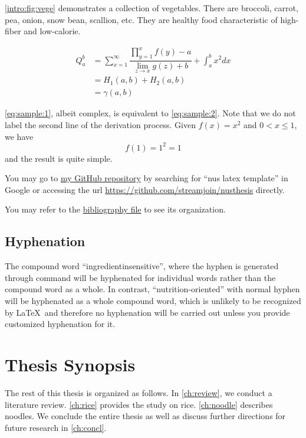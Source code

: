\autoref{intro:fig:vege} demonstrates a collection of vegetables. 
There are broccoli, carrot, pea, onion, snow bean, scallion, etc.
They are healthy food characteristic of high-fiber and low-calorie. 

\begin{align}
  Q_{a}^{b} &= \sum_{x=1}^{\infty} \dfrac{\prod_{y=1}^{x} f(y) - a}{\lim_{z \to x} g(z) + b} + 
               \int_{a}^{b} x^2 dx \label{eq:sample:1}\\
            &= H_{1}(a, b) + H_{2}(a, b) \nonumber\\
            &= \gamma(a, b) \label{eq:sample:2}
\end{align}

\autoref{eq:sample:1}, albeit complex, is equivalent to \autoref{eq:sample:2}.
Note that we do not label the second line of the derivation process.
Given $f(x) = x^{2}$ and $0 < x \leq 1$, we have
\[
  f(1) = 1^{2} = 1
\]
and the result is quite simple. 

You may go to \href{https://github.com/streamjoin/nusthesis}{my GitHub repository} by searching for ``nus latex template'' in Google or accessing the url  \url{https://github.com/streamjoin/nusthesis} directly. 

You may refer to the \href{run:./src/references.bib}{bibliography file} to see its organization.  

\subsection{Hyphenation}

The compound word ``ingredient\zz{}insensitive'', where the hyphen is generated through command \CMD{\zz{}} will be hyphenated for individual words rather than the compound word as a whole. 
In contrast, ``nutrition-oriented'' with normal hyphen will be hyphenated as a whole compound word, which is unlikely to be recognized by \LaTeX\ and therefore no hyphenation will be carried out unless you provide customized hyphenation for it. 

\section{Thesis Synopsis}

The rest of this thesis is organized as follows. 
In \autoref{ch:review}, we conduct a literature review. 
\autoref{ch:rice} provides the study on rice. 
\autoref{ch:noodle} describes noodles. 
We conclude the entire thesis as well as discuss further directions for future research in \autoref{ch:concl}.
